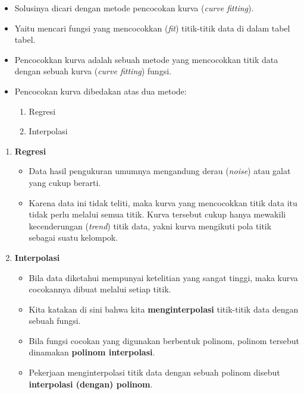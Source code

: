 \documentclass[pdflatex,compress,mathserif]{beamer}
\begin{document}
\begin{frame}
	\begin{itemize}
		\item Solusinya dicari dengan metode pencocokan kurva (\textit{curve fitting}).
		\item Yaitu mencari fungsi yang mencocokkan (\textit{fit}) titik-titik data di dalam tabel tabel.
		\item Pencocokkan kurva adalah sebuah metode yang mencocokkan titik data dengan sebuah kurva (\textit{curve fitting}) fungsi.
		\item Pencocokan kurva dibedakan atas dua metode:
		\begin{enumerate}
			\item Regresi
			\item Interpolasi
		\end{enumerate}
	\end{itemize}
\end{frame}

\begin{frame}
	\begin{enumerate}
		\item \textbf{Regresi}
		\begin{itemize}
			\item Data hasil pengukuran umumnya mengandung derau (\textit{noise}) atau galat yang cukup berarti.
			\item Karena data ini tidak teliti, maka kurva yang mencocokkan titik data itu tidak perlu melalui semua titik.
			Kurva tersebut cukup hanya mewakili kecenderungan (\textit{trend}) titik data, yakni kurva mengikuti pola titik sebagai suatu kelompok.
		\end{itemize}
	\end{enumerate}
\end{frame}

\begin{frame}
	\begin{enumerate}
		\setcounter{enumi}{1}
		\item \textbf{Interpolasi}
		\begin{itemize}
			\item Bila data diketahui mempunyai ketelitian yang sangat tinggi, maka kurva cocokannya dibuat melalui setiap titik.
			\item Kita katakan di sini bahwa kita \textbf{menginterpolasi} titik-titik data dengan sebuah fungsi.
			\item Bila fungsi cocokan yang digunakan berbentuk polinom, polinom tersebut dinamakan \textbf{polinom interpolasi}.
			\item Pekerjaan menginterpolasi titik data dengan sebuah polinom disebut \textbf{interpolasi (dengan) polinom}.
		\end{itemize}
	\end{enumerate}
\end{frame}
\end{document}
